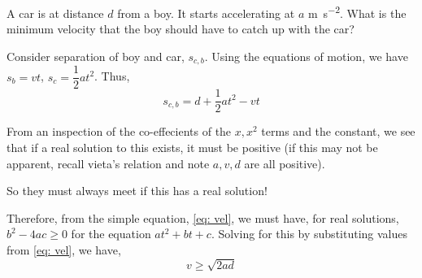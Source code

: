 \begin{example}
    A car is at distance \(d\) from a boy. It starts accelerating at \(a\) \unit{\metre\per\second\squared}. What is the minimum velocity that the boy should
    have to catch up with the car?

\begin{soln}
        Consider separation of boy and car, \(s_{c,b}\). Using the equations of motion, 
        we have \(s_{b} = vt\), \(s_{c} = \dfrac{1}{2}at^2\). Thus, 
        \begin{equation}
            \label{eq: vel}
            s_{c,b} = d + \frac{1}{2}at^2 - vt        
        \end{equation}
    
        From an inspection of the co-effecients of the \(x, x^2\) terms and the constant, 
        we see that if a real solution to this exists, it must be positive (if this may not be 
        apparent, recall vieta's relation and note \(a, v, d\) are all positive).

        So they must always meet if this has a real solution!

        Therefore, from the simple equation, \eqref{eq: vel}, we must have, for real solutions,
        \(b^2 - 4ac \ge 0\) for the equation \(at^2 + bt + c\). Solving for this by substituting values from
        \eqref{eq: vel}, we have,
            \begin{equation}
                v \ge \sqrt{2ad}
            \end{equation}
\end{soln}
\end{example}

